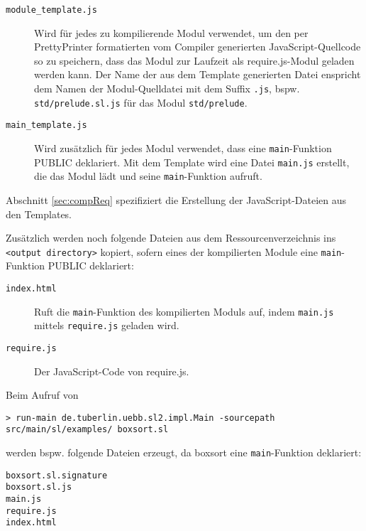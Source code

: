 \documentclass[runningheads]{llncs}
\begin{document}
\begin{description}
\begin{description}
        \begin{description}
        \item[\texttt{module\_template.js}] Wird für jedes zu
            kompilierende Modul verwendet, um den per PrettyPrinter
            formatierten vom Compiler generierten JavaScript-Quellcode
            so zu speichern, dass das Modul zur Laufzeit als
            require.js-Modul geladen werden kann. Der Name der
            aus dem Template generierten Datei enspricht dem Namen
            der Modul-Quelldatei mit dem Suffix \texttt{.js}, bspw.
            \texttt{std/prelude.sl.js} für das Modul \texttt{std/prelude}.
        \item[\texttt{main\_template.js}] Wird zusätzlich für jedes
            Modul verwendet, dass eine \texttt{main}-Funktion PUBLIC deklariert.
            Mit dem Template wird eine Datei \texttt{main.js} erstellt,
            die das Modul lädt und seine \texttt{main}-Funktion aufruft.
        \end{description}
        
        Abschnitt \ref{sec:compReq} spezifiziert die Erstellung der
        JavaScript-Dateien aus den Templates.
                
        Zusätzlich werden noch folgende Dateien aus dem
        Ressourcenverzeichnis ins \texttt{<output directory>} kopiert,
        sofern eines der kompilierten Module eine \texttt{main}-Funktion
        PUBLIC deklariert:
        
        \begin{description}
        \item[\texttt{index.html}] Ruft die \texttt{main}-Funktion des
            kompilierten Moduls auf, indem \texttt{main.js} mittels
            \texttt{require.js} geladen wird.
        \item[\texttt{require.js}] Der JavaScript-Code von require.js.
        \end{description}
        
        Beim Aufruf von
         
\begin{verbatim}
> run-main de.tuberlin.uebb.sl2.impl.Main -sourcepath
src/main/sl/examples/ boxsort.sl
\end{verbatim}

        werden bspw. folgende Dateien erzeugt, da boxsort eine
        \texttt{main}-Funktion deklariert:
        
\begin{verbatim}
boxsort.sl.signature
boxsort.sl.js
main.js
require.js
index.html
\end{verbatim}


\end{description}
\end{description}
\end{document}
